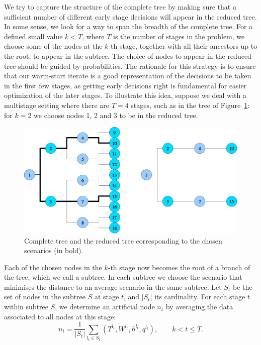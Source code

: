 We try to capture the structure of the complete tree by making sure 
that a sufficient number of different early stage decisions will 
appear in the reduced tree. In some sense, we look for a way to span 
the breadth of the complete tree. For a defined small value $k < T$, where 
$T$ is the number of stages in the problem, we choose some of the 
nodes at the $k$-th stage, together with all their ancestors up to the 
root, to appear in the subtree. The choice of nodes to appear in
the reduced tree should be guided by probabilities.
The rationale for this strategy is to ensure that our warm-start 
iterate is a good representation of the decisions to be taken 
in the first few stages, as getting early decisions right is fundamental
for easier optimization of the later stages.
%
To illustrate this idea, suppose we deal with a multistage setting where 
there are $T=4$ stages, such as in the tree of Figure~\ref{fig:Tree}: 
for $k=2$ we choose nodes 1, 2 and 3 to be in the reduced tree.
\begin{figure}[ht]
  \begin{center}
    \includegraphics[scale=.6]{figures/redtree.eps}
    \caption{Complete tree and the reduced tree corresponding to the
             chosen scenarios (in bold).}
    \label{fig:Tree}
  \end{center}
  \vspace{-3ex}
\end{figure}

Each of the chosen nodes in the $k$-th stage now becomes the root of a 
branch of the tree, which we call a subtree. In each subtree we choose 
the scenario that minimises the distance to an average scenario in the 
same subtree.
%
Let $S_t$ be the set of nodes in the subtree $S$ at stage $t$, and 
$|S_t|$ its cardinality. For each stage $t$ within subtree $S$, 
we determine an artificial node $n_t$ by averaging the data 
associated to all nodes at this stage:
\[
n_t = \frac{1}{|S_t|} \sum_{l_t \in S_t} (T^{l_t}, W^{l_t}, h^{l_t}, q^{l_t}),
  \qquad k < t \le T.
\]

